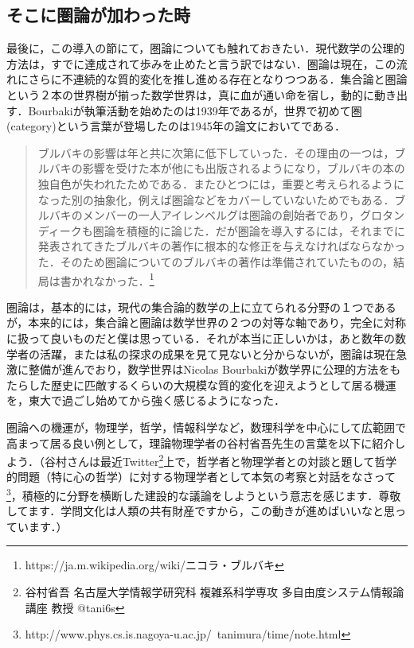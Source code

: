 \documentclass[uplatex, 12pt, a4paper, dvipdfmx]{jsarticle}
\begin{document}
\subsection{そこに圏論が加わった時}

最後に，この導入の節にて，圏論についても触れておきたい．現代数学の公理的方法は，すでに達成されて歩みを止めたと言う訳ではない．圏論は現在，この流れにさらに不連続的な質的変化を推し進める存在となりつつある．集合論と圏論という２本の世界樹が揃った数学世界は，真に血が通い命を宿し，動的に動き出す．Bourbakiが執筆活動を始めたのは1939年であるが，世界で初めて圏(category)という言葉が登場したのは1945年の論文においてである．

\begin{quote}
	ブルバキの影響は年と共に次第に低下していった．その理由の一つは，ブルバキの影響を受けた本が他にも出版されるようになり，ブルバキの本の独自色が失われたためである．またひとつには，重要と考えられるようになった別の抽象化，例えば圏論などをカバーしていないためでもある．ブルバキのメンバーの一人アイレンベルグは圏論の創始者であり，グロタンディークも圏論を積極的に論じた．だが圏論を導入するには，それまでに発表されてきたブルバキの著作に根本的な修正を与えなければならなかった．そのため圏論についてのブルバキの著作は準備されていたものの，結局は書かれなかった．\footnote{https://ja.m.wikipedia.org/wiki/ニコラ・ブルバキ}
\end{quote}

圏論は，基本的には，現代の集合論的数学の上に立てられる分野の１つであるが，本来的には，集合論と圏論は数学世界の２つの対等な軸であり，完全に対称に扱って良いものだと僕は思っている．それが本当に正しいかは，あと数年の数学者の活躍，または私の探求の成果を見て見ないと分からないが，圏論は現在急激に整備が進んでおり，数学世界はNicolas Bourbakiが数学界に公理的方法をもたらした歴史に匹敵するくらいの大規模な質的変化を迎えようとして居る機運を，東大で過ごし始めてから強く感じるようになった．\par
圏論への機運が，物理学，哲学，情報科学など，数理科学を中心にして広範囲で高まって居る良い例として，理論物理学者の谷村省吾先生の言葉を以下に紹介しよう．（谷村さんは最近Twitter\footnote{谷村省吾 名古屋大学情報学研究科 複雑系科学専攻 多自由度システム情報論講座 教授 @tani6s}上で，哲学者と物理学者との対談と題して哲学的問題（特に心の哲学）に対する物理学者として本気の考察と対話をなさって\footnote{http://www.phys.cs.is.nagoya-u.ac.jp/~tanimura/time/note.html}，積極的に分野を横断した建設的な議論をしようという意志を感じます．尊敬してます．学問文化は人類の共有財産ですから，この動きが進めばいいなと思っています．）
\end{document}
